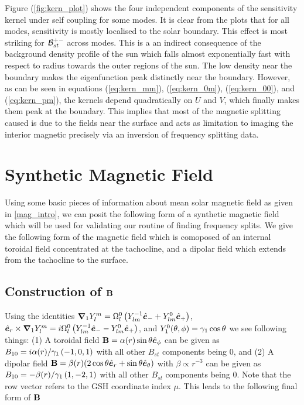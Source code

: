 Figure (\ref{fig:kern_plot}) shows the four independent components of the sensitivity kernel under self coupling for some modes. It is clear from the plots that for all modes, sensitivity is mostly localised to the solar boundary. This effect is most striking for $\mathcal{B}^{+-}_{st}$ across modes. This is a an indirect consequence of the background density profile of the sun which falls almost exponentially fast with respect to radius towards the outer regions of the sun. The low density near the boundary makes the eigenfunction peak distinctly near the boundary. However, as can be seen in equations (\ref{eq:kern_mm}), (\ref{eq:kern_0m}), (\ref{eq:kern_00}), and (\ref{eq:kern_pm}), the kernels depend quadratically on $U$ and $V$, which finally makes them peak at the boundary. This implies that most of the magnetic splitting caused is due to the fields near the surface and acts as limitation to imaging the interior magnetic precisely via an inversion of frequency splitting data.


\section{Synthetic Magnetic Field}
Using some basic pieces of information about mean solar magnetic field as given in \ref{mag_intro}, we can posit the following form of a synthetic magnetic field which will be used for validating our routine of finding frequency splits. We give the following form of the magnetic field which is comoposed of an internal toroidal field concentrated at the tachocline, and a dipolar field which extends from the tachocline to the surface.

\subsection{Construction of $\mathbf{B}$}\label{sec:B_construction}
Using the identities $\bm{\nabla}_1 Y_l^m = \Omega_{l}^{0} \left( Y_{lm}^{-1} \hat{\bm{e}}_{-} + Y_{lm}^0 \hat{\bm{e}}_{+} \right)$, $\hat{\bm{e}}_{r} \times\bm{\nabla}_1 Y_l^m = i\Omega_{l}^{0} \left( Y_{lm}^{-1} \hat{\bm{e}}_{-} - Y_{lm}^0 \hat{\bm{e}}_{+} \right)$, and $Y_1^0(\theta,\phi) = \gamma_{1}\cos\theta$ we see following things: (1) A toroidal field $\mathbf{B} = \alpha(r) \sin\theta \hat{\bm{e}}_{\phi}$ can be given as $B_{10} = i \alpha(r) / \gamma_{1} \left( -1,0,1 \right)$ with all other $B_{st}$ components being $0$, and (2) A dipolar field $\mathbf{B} = \beta(r) (2\cos\theta \hat{\bm{e}}_{r} + \sin\theta\hat{\bm{e}}_{\theta})$ with $\beta \propto r^{-3}$ can be given as $B_{10} = -\beta(r)/\gamma_{1} \left( 1,-2,1 \right)$ with all other $B_{st}$ components being $0$. Note that the row vector refers to the GSH coordinate index $\mu$. This leads to the following final form of $\mathbf{B}$

